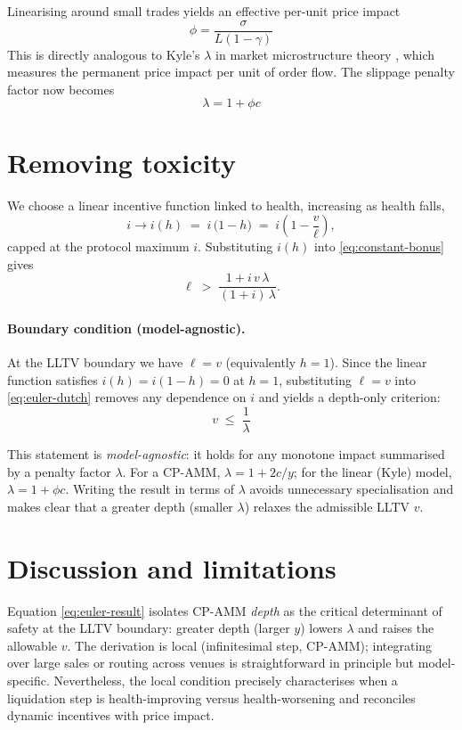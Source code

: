 \documentclass[11pt]{article}
\begin{document}
Linearising around small trades yields an effective per-unit price impact
\[
\phi = \frac{\sigma}{L(1-\gamma)}
\]
This is directly analogous to Kyle’s $\lambda$ in market microstructure theory \cite{Kyle1985}, which measures the permanent price impact per unit of order flow. The slippage penalty factor now becomes
\[
\lambda = 1 + \phi c
\]

\section{Removing toxicity}
We choose a linear incentive function linked to health, increasing as health falls,
\[
i \to i(h) \;=\; i\,\bigl(1-h\bigr)
\;=\; i\!\left(1 - \frac{v}{\ell}\right),
\]
capped at the protocol maximum \(i\). Substituting \(i(h)\) into \eqref{eq:constant-bonus} gives
\begin{equation}
\ell \;>\; \frac{1 + i\,v\,\lambda}{(1+i)\,\lambda}.
\label{eq:euler-dutch}
\end{equation}

\paragraph{Boundary condition (model-agnostic).}
At the LLTV boundary we have $\ell = v$ (equivalently $h=1$). Since the linear function satisfies $i(h)=i(1-h)=0$ at $h=1$, substituting $\ell=v$ into \eqref{eq:euler-dutch} removes any dependence on $i$ and yields a depth-only criterion:
\begin{equation}
\, v \;\le\; \frac{1}{\lambda}\,
\label{eq:euler-result}
\end{equation}

\noindent
This statement is \emph{model-agnostic}: it holds for any monotone impact summarised by a penalty factor $\lambda$. For a CP-AMM, $\lambda=1+2c/y$; for the linear (Kyle) model, $\lambda=1+\phi c$. Writing the result in terms of $\lambda$ avoids unnecessary specialisation and makes clear that a greater depth (smaller $\lambda$) relaxes the admissible LLTV $v$.


\section{Discussion and limitations}
Equation \eqref{eq:euler-result} isolates CP-AMM \emph{depth} as the critical determinant of safety at the LLTV boundary: greater depth (larger \(y\)) lowers \(\lambda\) and raises the allowable \(v\). The derivation is local (infinitesimal step, CP-AMM); integrating over large sales or routing across venues is straightforward in principle but model-specific. Nevertheless, the local condition precisely characterises when a liquidation step is health-improving versus health-worsening and reconciles dynamic incentives with price impact.
\end{document}

